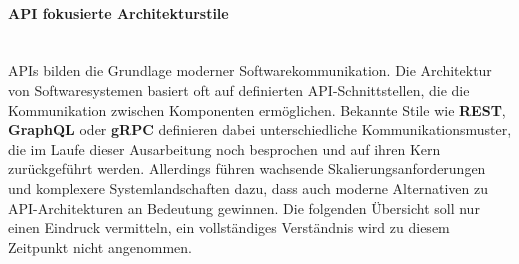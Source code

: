\documentclass[../vs-script-first-v01.tex]{subfiles}
\begin{document}
\paragraph{API fokusierte Architekturstile}
\mbox{}\\
APIs bilden die Grundlage moderner Softwarekommunikation. Die Architektur von Softwaresystemen basiert oft auf definierten API-Schnittstellen, die die Kommunikation zwischen Komponenten ermöglichen. Bekannte Stile wie \textbf{REST}, \textbf{GraphQL} oder \textbf{gRPC} definieren dabei unterschiedliche Kommunikationsmuster, die im Laufe dieser Ausarbeitung noch besprochen und auf ihren Kern zurückgeführt werden. 
Allerdings führen wachsende Skalierungsanforderungen und komplexere Systemlandschaften dazu, dass auch moderne Alternativen zu API-Architekturen an Bedeutung gewinnen. Die folgenden Übersicht soll nur einen Eindruck vermitteln, ein vollständiges Verständnis wird zu diesem Zeitpunkt nicht angenommen.
\end{document}

